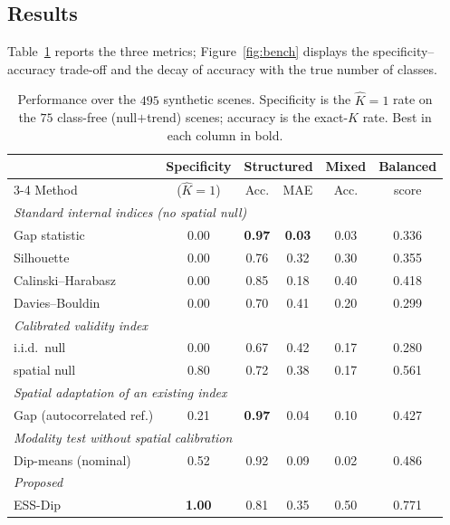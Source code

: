 \subsection{Results}\label{subsec:simresults}

Table~\ref{tab:bench} reports the three metrics; Figure~\ref{fig:bench}
displays the specificity--accuracy trade-off and the decay of accuracy with
the true number of classes.

\begin{table}[t]
\centering
\caption{Performance over the $495$ synthetic scenes. Specificity is the
$\hat K{=}1$ rate on the $75$ class-free (null${+}$trend) scenes; accuracy is
the exact-$K$ rate. Best in each column in bold.}
\label{tab:bench}
\begin{tabular}{l c cc c c}
\toprule
 & Specificity & \multicolumn{2}{c}{Structured} & Mixed & Balanced\\
\cmidrule(lr){3-4}
Method & ($\hat K{=}1$) & Acc. & MAE & Acc. & score\\
\midrule
\multicolumn{6}{l}{\textit{Standard internal indices} \textit{(no spatial null)}}\\
Gap statistic            & 0.00 & \textbf{0.97} & \textbf{0.03} & 0.03 & 0.336\\
Silhouette               & 0.00 & 0.76 & 0.32 & 0.30 & 0.355\\
Calinski--Harabasz       & 0.00 & 0.85 & 0.18 & 0.40 & 0.418\\
Davies--Bouldin          & 0.00 & 0.70 & 0.41 & 0.20 & 0.299\\
\midrule
\multicolumn{6}{l}{\textit{Calibrated validity index} \citep{HennigLin2015}}\\
\quad i.i.d.\ null       & 0.00 & 0.67 & 0.42 & 0.17 & 0.280\\
\quad spatial null       & 0.80 & 0.72 & 0.38 & 0.17 & 0.561\\
\midrule
\multicolumn{6}{l}{\textit{Spatial adaptation of an existing index}}\\
Gap (autocorrelated ref.) & 0.21 & \textbf{0.97} & 0.04 & 0.10 & 0.427\\
\midrule
\multicolumn{6}{l}{\textit{Modality test without spatial calibration}}\\
Dip-means (nominal)      & 0.52 & 0.92 & 0.09 & 0.02 & 0.486\\
\midrule
\multicolumn{6}{l}{\textit{Proposed}}\\
ESS-Dip                  & \textbf{1.00} & 0.81 & 0.35 & 0.50 & 0.771\\

\end{tabular}
\end{table}
